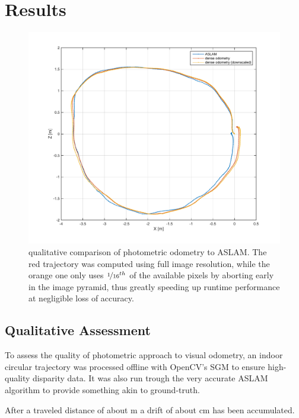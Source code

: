 \chapter{Results}
\label{sec:results}



\begin{figure}
    \centering
    \includegraphics[width=\textwidth]{images/traj_aslam_downscaled.pdf}
    \caption{qualitative comparison of photometric odometry to ASLAM. The red
    trajectory was computed using full image resolution, while the orange one
    only uses $\nicefrac{1}{16}^{th}$ of the available pixels by aborting early in
the image pyramid, thus greatly speeding up runtime performance at negligible
loss of accuracy.}
    \label{fig:trajectory}
\end{figure}

\section{Qualitative Assessment}
\label{sec:results_qualitative}

To assess the quality of photometric approach to visual odometry, an indoor
circular trajectory was processed offline with OpenCV's SGM to ensure
high-quality disparity data.  It was also run trough the very accurate ASLAM
algorithm \cite{leutenegger2013keyframe} to provide something akin to
ground-truth.

After a traveled distance of about \unit[12]{m} a drift of about \unit[20]{cm}
has been accumulated.

